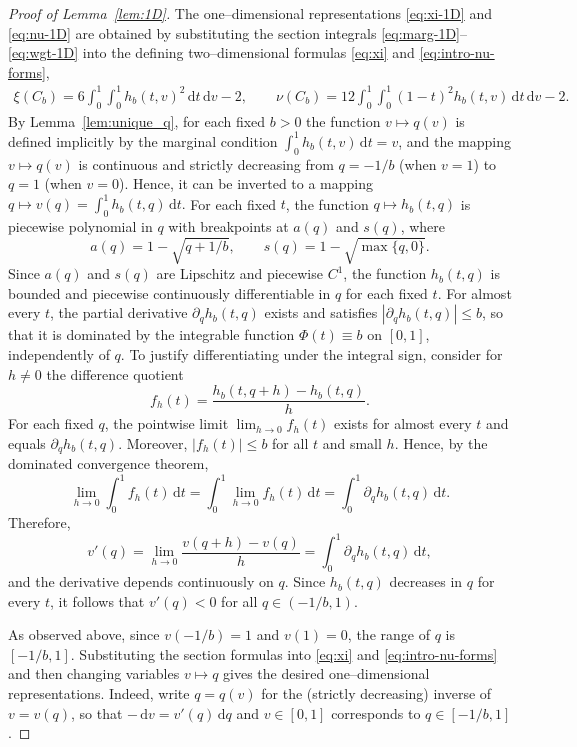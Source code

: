 \documentclass{article}
\newcommand{\1}{\mathds{1}}
\newcommand{\de}{\mathrm{\,d}}
\begin{document}
\begin{proof}[Proof of Lemma~\ref{lem:1D}]
The one–dimensional representations \eqref{eq:xi-1D} and \eqref{eq:nu-1D} are obtained by substituting the section integrals \eqref{eq:marg-1D}--\eqref{eq:wgt-1D} into the defining two–dimensional formulas \eqref{eq:xi} and \eqref{eq:intro-nu-forms},
\begin{align}\label{eq:both_measures}
\xi(C_b)=6\!\!\int_0^1\!\!\int_0^1 h_b(t,v)^2\de t\de v -2,
\qquad
\nu(C_b)=12\!\!\int_0^1\!\!\int_0^1 (1-t)^2 h_b(t,v)\de t\de v -2.
\end{align}
By Lemma~\ref{lem:unique_q}, for each fixed \(b>0\) the function \(v\mapsto q(v)\) is defined implicitly by the marginal condition \(\int_0^1 h_b(t,v)\de t=v\), and the mapping \(v\mapsto q(v)\) is continuous and strictly decreasing from \(q=-1/b\) (when \(v=1\)) to \(q=1\) (when \(v=0\)).
Hence, it can be inverted to a mapping 
\(
q \mapsto v(q) = \int_0^1 h_b(t,q)\de t.
\)
For each fixed \(t\), the function \(q \mapsto h_b(t,q)\) is piecewise polynomial in \(q\) with breakpoints 
at \(a(q)\) and \(s(q)\), where
\[
a(q) = 1 - \sqrt{q + 1/b}, 
\qquad 
s(q) = 1 - \sqrt{\max\{q,0\}}.
\]
Since \(a(q)\) and \(s(q)\) are Lipschitz and piecewise \(C^{1}\), the function 
\(h_b(t,q)\) is bounded and piecewise continuously differentiable in \(q\) for each fixed \(t\).
For almost every \(t\), the partial derivative \(\partial_q h_b(t,q)\) exists and satisfies 
\(|\partial_q h_b(t,q)| \le b\), so that it is dominated by the integrable function 
\(\Phi(t) \equiv b\) on \([0,1]\), independently of \(q\).
To justify differentiating under the integral sign, consider for \(h\neq 0\) the difference quotient
\[
f_h(t) = \frac{h_b(t,q+h) - h_b(t,q)}{h}.
\]
For each fixed \(q\), the pointwise limit \(\lim_{h\to 0} f_h(t)\) exists for almost every \(t\) and equals \(\partial_q h_b(t,q)\).
Moreover, \(|f_h(t)| \le b\) for all \(t\) and small \(h\).
Hence, by the dominated convergence theorem, %
\[
\lim_{h\to 0} \int_0^1 f_h(t)\de t
= \int_0^1 \lim_{h\to 0} f_h(t)\de t
= \int_0^1 \partial_q h_b(t,q)\de t.
\]
Therefore,
\[
v'(q)
= \lim_{h\to 0} \frac{v(q+h)-v(q)}{h}
= \int_0^1 \partial_q h_b(t,q)\de t,
\]
and the derivative depends continuously on \(q\).
Since \(h_b(t,q)\) decreases in \(q\) for every \(t\), it follows that \(v'(q)<0\) for all \(q\in(-1/b,1)\).

As observed above, since \(v(-1/b)=1\) and \(v(1)=0\), the range of \(q\) is \([{-}1/b,1]\).
Substituting the section formulas into \eqref{eq:xi} and \eqref{eq:intro-nu-forms} and then changing variables $v\mapsto q$
gives the desired one–dimensional representations.
Indeed, write $q=q(v)$ for the (strictly decreasing) inverse of $v=v(q)$, so that $-\de v = v'(q)\de q$ and $v\in[0,1]$ corresponds to $q\in[-1/b,1]$.


\end{proof}
\end{document}
